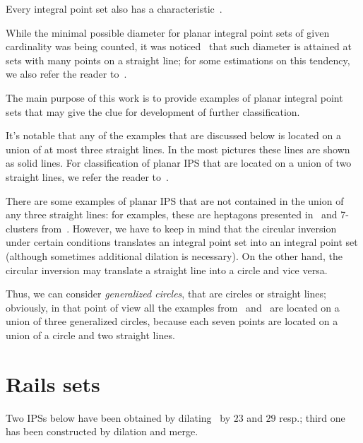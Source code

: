 \documentclass[12pt]{article}
\theoremstyle{theorem}
\theoremstyle{dfn}
\theoremstyle{remark}
\begin{document}
Every integral point set also has a characteristic~\cite{kemnitz1988punktmengen,kurz2005characteristic}.


While the minimal possible diameter for planar integral point sets of given cardinality was being counted,
it was noticed~\cite{kurz2008minimum} that such diameter is attained at sets with many points on a straight line;
for some estimations on this tendency, we also refer the reader to~\cite{solymosi2003note}.






The main purpose of this work is to provide examples of planar integral point sets
that may give the clue for development of further classification.

It's notable that any of the examples that are discussed below
is located on a union of at most three straight lines.
In the most pictures these lines are shown as solid lines.
For classification of planar IPS that are located on a union of two straight lines,
we refer the reader to~\cite{avdeev2019particular}.

There are some examples of planar IPS that are not contained in the union of any three straight lines:
for examples, these are heptagons presented in~\cite{kreisel2008heptagon} and 7-clusters from~\cite{kurz2013constructing}.
However, we have to keep in mind that the circular inversion under certain conditions
translates an integral point set into an integral point set
(although sometimes additional dilation is necessary).
On the other hand, the circular inversion may translate a straight line into a circle and vice versa.

Thus, we can consider \emph{generalized circles}, that are circles or straight lines;
obviously, in that point of view all the examples from~\cite{kreisel2008heptagon} and~\cite{kurz2013constructing}
are located on a union of three generalized circles,
because each seven points are located on a union of a circle and two straight lines.




\section{Rails sets}

Two IPSs below have been obtained by dilating~\cite[Fig. 34]{avdeev2019particular} by $23$ and $29$  resp.;
third one has been constructed by dilation and merge.
\end{document}
